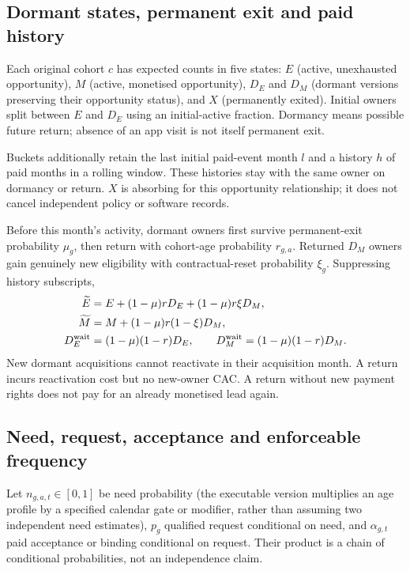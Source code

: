 \documentclass[11pt,a4paper]{article}
\begin{document}
\subsection{Dormant states, permanent exit and paid history}
Each original cohort $c$ has expected counts in five states: $E$ (active, unexhausted opportunity), $M$ (active, monetised opportunity), $D_E$ and $D_M$ (dormant versions preserving their opportunity status), and $X$ (permanently exited). Initial owners split between $E$ and $D_E$ using an initial-active fraction. Dormancy means possible future return; absence of an app visit is not itself permanent exit.

Buckets additionally retain the last initial paid-event month $l$ and a history $h$ of paid months in a rolling window. These histories stay with the same owner on dormancy or return. $X$ is absorbing for this opportunity relationship; it does not cancel independent policy or software records.

Before this month's activity, dormant owners first survive permanent-exit probability $\mu_g$, then return with cohort-age probability $r_{g,a}$. Returned $D_M$ owners gain genuinely new eligibility with contractual-reset probability $\xi_g$. Suppressing history subscripts,
\begin{align}
 \widetilde E&=E+(1-\mu)rD_E+(1-\mu)r\xi D_M,\\
 \widetilde M&=M+(1-\mu)r(1-\xi)D_M,\\
 D_E^{\rm wait}&=(1-\mu)(1-r)D_E,
 \qquad D_M^{\rm wait}=(1-\mu)(1-r)D_M.
\end{align}
New dormant acquisitions cannot reactivate in their acquisition month. A return incurs reactivation cost but no new-owner CAC. A return without new payment rights does not pay for an already monetised lead again.

\subsection{Need, request, acceptance and enforceable frequency}
Let $n_{g,a,t}\in[0,1]$ be need probability (the executable version multiplies an age profile by a specified calendar gate or modifier, rather than assuming two independent need estimates), $p_g$ qualified request conditional on need, and $\alpha_{g,t}$ paid acceptance or binding conditional on request. Their product is a chain of conditional probabilities, not an independence claim.
\end{document}
